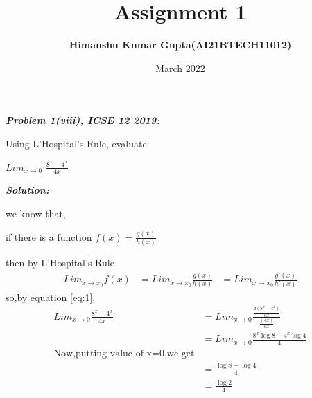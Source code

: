 \documentclass[journal,12pt,twocolumn]{IEEEtran}
\begin{document}
\newcommand{\myvec}[1]{\ensuremath{\begin{pmatrix}#1\end{pmatrix}}}

\let\vec\mathbf


\title{Assignment 1}
\author{\textbf{Himanshu Kumar Gupta(AI21BTECH11012)}}
\maketitle
\date {March 2022}


\textbf{\textit{Problem 1(viii), ICSE 12 2019:}}

Using L’Hospital’s Rule, evaluate:

 $Lim_{x\rightarrow0}$ $\frac{8^x-4^x}{4x}$

\textbf{\textit{Solution:}}

we know that,

if there is a function $f(x)=\frac{g(x)}{h(x)}$

then by L’Hospital’s Rule 
\begin{align}
\label{eq:1}
Lim_{x\rightarrow x_0}f(x)&=Lim_{x\rightarrow x_0}\frac{g(x)}{h(x)}
&=Lim_{x\rightarrow x_0}\frac{g'(x)}{h'(x)}
\end{align}
so,by equation \eqref{eq:1},
\begin{align}
Lim_{x\rightarrow0}\frac{8^x-4^x}{4x}&=Lim_{x\rightarrow0}\frac{\frac{d(8^x-4^x)}{dx}}{\frac{(4x)}{dx}}         \\
&=Lim_{x\rightarrow0}\frac{8^x\log{8}-4^x\log{4}}{4}\\
\text{Now,putting value of x=0,we get}       \nonumber\\
&=\frac{\log{8}-\log{4}}{4}       \\
&=\frac{\log{2}}{4}
\end{align}
\end{document}
